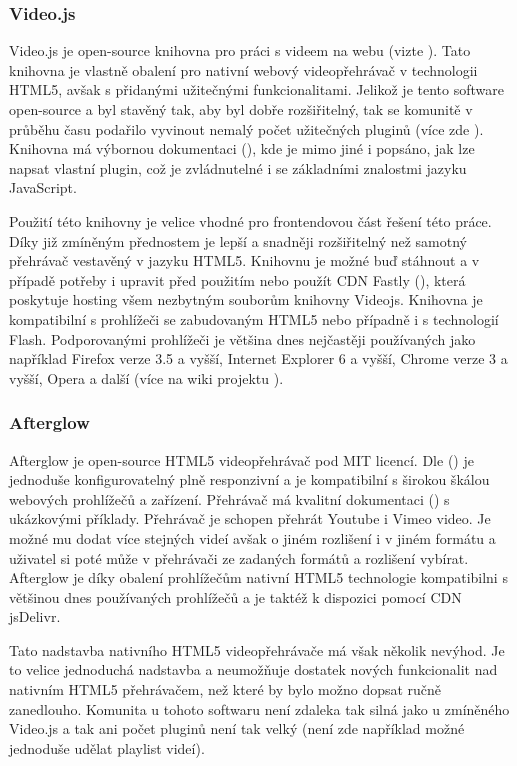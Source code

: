 \documentclass[thesis=M,czech]{FITthesis}[2012/06/26]
\begin{document}
\subsubsection{Video.js} \label{subsubsec:analyza_reseni_videojs}
Video.js je open-source knihovna pro práci s videem na webu (vizte \cite{videojs_web}). Tato knihovna je vlastně obalení pro nativní webový videopřehrávač v technologii HTML5, avšak s přidanými užitečnými funkcionalitami. Jelikož je tento software open-source a byl stavěný tak, aby byl dobře rozšiřitelný, tak se komunitě v průběhu času podařilo vyvinout nemalý počet užitečných pluginů (více zde \cite{videojs_plg}). Knihovna má výbornou dokumentaci (\cite{videojs_doc}), kde je mimo jiné i popsáno, jak lze napsat vlastní plugin, což je zvládnutelné i se základními znalostmi jazyku JavaScript. 
	
	Použití této knihovny je velice vhodné pro frontendovou část řešení této práce. Díky již zmíněným přednostem je lepší a snadněji rozšiřitelný než samotný přehrávač vestavěný v jazyku HTML5. Knihovnu je možné buď stáhnout a v případě potřeby i upravit před použitím nebo použít CDN Fastly (\cite{fastly_cdn}), která poskytuje hosting všem nezbytným souborům knihovny Videojs. Knihovna je kompatibilní s prohlížeči se zabudovaným HTML5 nebo případně i s technologií Flash. Podporovanými prohlížeči je většina dnes nejčastěji používaných jako například Firefox verze 3.5 a vyšší, Internet Explorer 6 a vyšší, Chrome verze 3 a vyšší, Opera a další (více na wiki projektu \cite{videojs_wiki}).

\subsubsection{Afterglow} \label{subsubsec:analyza_reseni_afterglow}
Afterglow je open-source HTML5 videopřehrávač pod MIT licencí. Dle (\cite{afterglow}) je jednoduše konfigurovatelný plně responzivní a je kompatibilní s širokou škálou webových prohlížečů a zařízení. Přehrávač má kvalitní dokumentaci (\cite{afterglow_doc}) s ukázkovými příklady. Přehrávač je schopen přehrát Youtube i Vimeo video. Je možné mu dodat více stejných videí avšak o jiném rozlišení i v jiném formátu a uživatel si poté může v přehrávači ze zadaných formátů a rozlišení vybírat. Afterglow je díky obalení prohlížečům nativní HTML5 technologie kompatibilni s většinou dnes používaných prohlížečů a je taktéž k dispozici pomocí CDN jsDelivr.
	
	Tato nadstavba nativního HTML5 videopřehrávače má však několik nevýhod. Je to velice jednoduchá nadstavba a neumožňuje dostatek nových funkcionalit nad nativním HTML5 přehrávačem, než které by bylo možno dopsat ručně zanedlouho. Komunita u tohoto softwaru není zdaleka tak silná jako u zmíněného Video.js a tak ani počet pluginů není tak velký (není zde například možné jednoduše udělat playlist videí).
\end{document}
